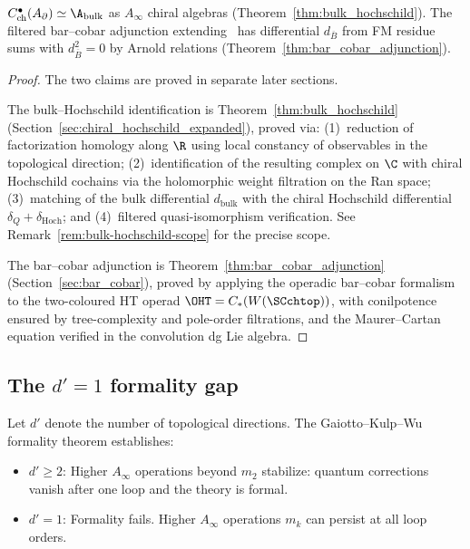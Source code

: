 \begin{theorem}
\label{thm:bulk-hochschild-roadmap}
$C^\bullet_{\mathrm{ch}}(A_\partial) \simeq \A_{\text{bulk}}$ as $A_\infty$ chiral algebras (Theorem~\ref{thm:bulk_hochschild}). The filtered bar--cobar adjunction extending~\cite{GLZ22} has differential $d_{\overline{B}}$ from FM residue sums with $d_{\overline{B}}^2 = 0$ by Arnold relations (Theorem~\ref{thm:bar_cobar_adjunction}).
\end{theorem}

\begin{proof}
The two claims are proved in separate later sections.

The bulk--Hochschild identification is Theorem~\ref{thm:bulk_hochschild} (Section~\ref{sec:chiral_hochschild_expanded}), proved via: (1)~reduction of factorization homology along $\R$ using local constancy of observables in the topological direction; (2)~identification of the resulting complex on $\C$ with chiral Hochschild cochains via the holomorphic weight filtration on the Ran space; (3)~matching of the bulk differential $d_{\mathrm{bulk}}$ with the chiral Hochschild differential $\delta_Q + \delta_{\mathrm{Hoch}}$; and (4)~filtered quasi-isomorphism verification. See Remark~\ref{rem:bulk-hochschild-scope} for the precise scope.

The bar--cobar adjunction is Theorem~\ref{thm:bar_cobar_adjunction} (Section~\ref{sec:bar_cobar}), proved by applying the operadic bar--cobar formalism to the two-coloured HT operad $\OHT = C_\ast(W(\SCchtop))$, with conilpotence ensured by tree-complexity and pole-order filtrations, and the Maurer--Cartan equation verified in the convolution dg Lie algebra.
\end{proof}

\label{sec:bridge-inputs-summary}

\subsection{The $d'=1$ formality gap}

Let $d'$ denote the number of topological directions. The Gaiotto--Kulp--Wu formality theorem \cite{GKW25} establishes:

\begin{itemize}
\item \textbf{$d' \geq 2$}: Higher $A_\infty$ operations beyond $m_2$ stabilize: quantum corrections vanish after one loop and the theory is formal.

\item \textbf{$d' = 1$}: Formality fails. Higher $A_\infty$ operations $m_k$ can persist at all loop orders.
\end{itemize}

